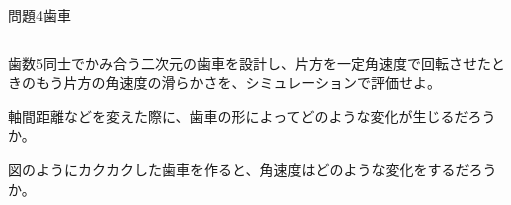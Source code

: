 \documentclass[dvipdfmx]{beamer}
\newenvironment{wideitemize}{\itemize\setlength{\itemsep}{1em}}{\enditemize}
\newenvironment{wideitemize2}{\itemize\setlength{\itemsep}{0.2em}}{\enditemize}
\begin{document}

\begin{frame}{問題4}{歯車}
\begin{columns}[t]
\begin{column}{0.7\textwidth}
\begin{wideitemize}
	\item 歯数5同士でかみ合う二次元の歯車を設計し、片方を一定角速度で回転させたときのもう片方の角速度の滑らかさを、シミュレーションで評価せよ。
	\begin{wideitemize2}
		\item 軸間距離などを変えた際に、歯車の形によってどのような変化が生じるだろうか。
		\item 図のようにカクカクした歯車を作ると、角速度はどのような変化をするだろうか。
	\end{wideitemize2}

\end{wideitemize}


\end{column}
\end{columns}
\end{frame}
\end{document}
